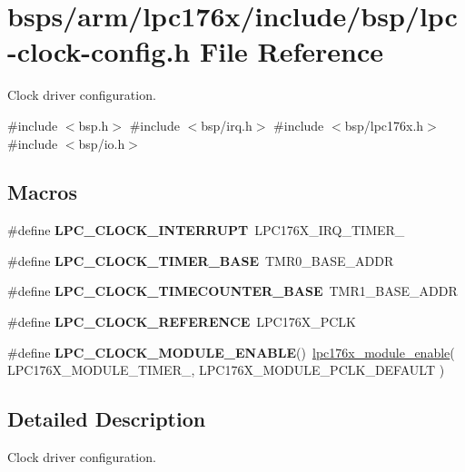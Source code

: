 \hypertarget{lpc176x_2include_2bsp_2lpc-clock-config_8h}{}\section{bsps/arm/lpc176x/include/bsp/lpc-\/clock-\/config.h File Reference}
\label{lpc176x_2include_2bsp_2lpc-clock-config_8h}


Clock driver configuration.  


{\ttfamily \#include $<$bsp.\+h$>$}\newline
{\ttfamily \#include $<$bsp/irq.\+h$>$}\newline
{\ttfamily \#include $<$bsp/lpc176x.\+h$>$}\newline
{\ttfamily \#include $<$bsp/io.\+h$>$}\newline
\subsection*{Macros}
\begin{DoxyCompactItemize}
\item 
\mbox{\label{lpc176x_2include_2bsp_2lpc-clock-config_8h_ac1220f34104208e6ff5cfdd6b398aba8}} 
\#define {\bfseries L\+P\+C\+\_\+\+C\+L\+O\+C\+K\+\_\+\+I\+N\+T\+E\+R\+R\+U\+PT}~L\+P\+C176\+X\+\_\+\+I\+R\+Q\+\_\+\+T\+I\+M\+E\+R\+\_
\item 
\mbox{\label{lpc176x_2include_2bsp_2lpc-clock-config_8h_ab76011fa470983732aa4646723ff94f5}} 
\#define {\bfseries L\+P\+C\+\_\+\+C\+L\+O\+C\+K\+\_\+\+T\+I\+M\+E\+R\+\_\+\+B\+A\+SE}~T\+M\+R0\+\_\+\+B\+A\+S\+E\+\_\+\+A\+D\+DR
\item 
\mbox{\label{lpc176x_2include_2bsp_2lpc-clock-config_8h_ac46820b8bec32680b474d61bebb1b7d1}} 
\#define {\bfseries L\+P\+C\+\_\+\+C\+L\+O\+C\+K\+\_\+\+T\+I\+M\+E\+C\+O\+U\+N\+T\+E\+R\+\_\+\+B\+A\+SE}~T\+M\+R1\+\_\+\+B\+A\+S\+E\+\_\+\+A\+D\+DR
\item 
\mbox{\label{lpc176x_2include_2bsp_2lpc-clock-config_8h_addc938908b1ed7eb314ba94b0cf188ef}} 
\#define {\bfseries L\+P\+C\+\_\+\+C\+L\+O\+C\+K\+\_\+\+R\+E\+F\+E\+R\+E\+N\+CE}~L\+P\+C176\+X\+\_\+\+P\+C\+LK
\item 
\mbox{\label{lpc176x_2include_2bsp_2lpc-clock-config_8h_a9e10fd86cae2310ffaee1a8478d35cd0}} 
\#define {\bfseries L\+P\+C\+\_\+\+C\+L\+O\+C\+K\+\_\+\+M\+O\+D\+U\+L\+E\+\_\+\+E\+N\+A\+B\+LE}()~\mbox{\hyperlink{bsps_2arm_2lpc176x_2start_2io_8c_ae2435751a8b1a9aeb44e97281cf228b3}{lpc176x\+\_\+module\+\_\+enable}}( L\+P\+C176\+X\+\_\+\+M\+O\+D\+U\+L\+E\+\_\+\+T\+I\+M\+E\+R\+\_, L\+P\+C176\+X\+\_\+\+M\+O\+D\+U\+L\+E\+\_\+\+P\+C\+L\+K\+\_\+\+D\+E\+F\+A\+U\+LT )
\end{DoxyCompactItemize}


\subsection{Detailed Description}
Clock driver configuration. 

